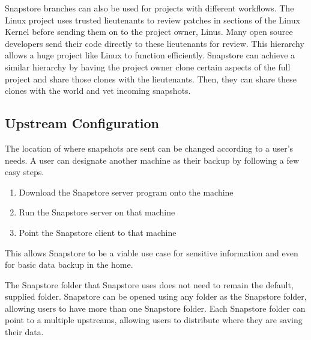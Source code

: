 Snapstore branches can also be used for projects with different workflows. The Linux project uses trusted lieutenants to review patches in sections of the Linux Kernel before sending them on to the project owner, Linus. Many open source developers send their code directly to these lieutenants for review. This hierarchy allows a huge project like Linux to function efficiently. Snapstore can achieve a similar hierarchy by having the project owner clone certain aspects of the full project and share those clones with the lieutenants. Then, they can share these clones with the world and vet incoming snapshots.

\subsection{Upstream Configuration}

The location of where snapshots are sent can be changed according to a user's needs. A user can designate another machine as their backup by following a few easy steps. 
\begin{enumerate}
  \item{Download the Snapstore server program onto the machine}
  \item{Run the Snapstore server on that machine}
  \item{Point the Snapstore client to that machine}
\end{enumerate}

This allows Snapstore to be a viable use case for sensitive information and even for basic data backup in the home.

The Snapstore folder that Snapstore uses does not need to remain the default, supplied folder. Snapstore can be opened using any folder as the Snapstore folder, allowing users to have more than one Snapstore folder. Each Snapstore folder can point to a multiple upstreams, allowing users to distribute where they are saving their data.